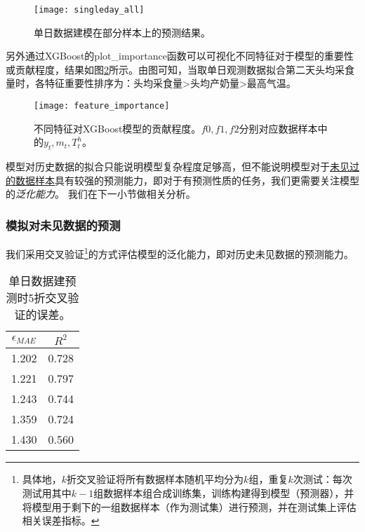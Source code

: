 \begin{figure}
\begin{center}
	\texttt{[image: singleday\_all]}
\caption{单日数据建模在部分样本上的预测结果。}
\label{fig:singleday_all}
\end{center}
\end{figure}

另外通过XGBoost的plot\_importance函数可以可视化不同特征对于模型的重要性或贡献程度，结果如图\ref{fig:feature_importance}所示。由图可知，当取单日观测数据拟合第二天头均采食量时，各特征重要性排序为：头均采食量>头均产奶量>最高气温。

\begin{figure}
\begin{center}
	\texttt{[image: feature\_importance]}
\caption{不同特征对XGBoost模型的贡献程度。$f0,f1,f2$分别对应数据样本中的$y_t, m_t, T^h_t$。}
\label{fig:feature_importance}
\end{center}
\end{figure}

模型对历史数据的拟合只能说明模型复杂程度足够高，但不能说明模型对于\uline{未见过的数据样本}具有较强的预测能力，即对于有预测性质的任务，我们更需要关注模型的\emph{泛化能力}。
我们在下一小节做相关分析。

\subsubsection{模拟对未见数据的预测}
\label{predict_singleday}

我们采用交叉验证\footnote{具体地，$k$折交叉验证将所有数据样本随机平均分为$k$组，重复$k$次测试：每次测试用其中$k-1$组数据样本组合成训练集，训练构建得到模型（预测器），并将模型用于剩下的一组数据样本（作为测试集）进行预测，并在测试集上评估相关误差指标。}的方式评估模型的泛化能力，即对历史未见数据的预测能力。


\begin{table}
\caption{单日数据建预测时5折交叉验证的误差。}
\begin{center}
\footnotesize
\begin{tabular}{|c|c|}
\hline
	$\epsilon_{MAE}$ & $R^2$ \\
\hline
 1.202 &  0.728\\
 1.221 &  0.797\\
 1.243 &  0.744 \\
 1.359 &  0.724 \\
 1.430 &  0.560 \\
\hline
\end{tabular}
\end{center}
\label{tab:singleday_predict_all}
\end{table}


